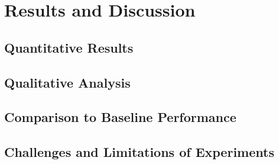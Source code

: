 \chapter{Results and Discussion}

\section{Quantitative Results}

\section{Qualitative Analysis}

\section{Comparison to Baseline Performance}

\section{Challenges and Limitations of Experiments}